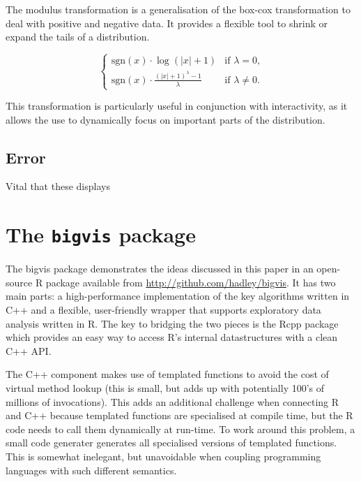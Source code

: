 \documentclass[journal]{vgtc}                %
\begin{document}
The modulus transformation \citep{john:1980} is a generalisation of the box-cox transformation \citep{box:1964} to deal with positive and negative data. It provides a flexible tool to shrink or expand the tails of a distribution.

\begin{equation}
\begin{cases} 
  \text{sgn}(x) \cdot \log(|x| + 1) & \text{if $\lambda = 0$,} \\
  \text{sgn}(x) \cdot \frac{(|x| + 1)^\lambda - 1}{\lambda} &\text{if $\lambda \ne 0$.}
\end{cases}
\end{equation}

This transformation is particularly useful in conjunction with interactivity, as it allows the use to dynamically focus on important parts of the distribution.

\subsection{Error}

Vital that these displays

\section{The {\tt bigvis} package}
\label{sec:bigvis}

The bigvis package demonstrates the ideas discussed in this paper in an open-source R package available from \url{http://github.com/hadley/bigvis}. It has two main parts: a high-performance implementation of the key algorithms written in C++ and a flexible, user-friendly wrapper that supports exploratory data analysis written in R. The key to bridging the two pieces is the Rcpp package \citep{eddelbuettel:2011} which provides an easy way to access R's internal datastructures with a clean C++ API. 

The C++ component makes use of templated functions to avoid the cost of virtual method lookup (this is small, but adds up with potentially 100's of millions of invocations). This adds an additional challenge when connecting R and C++ because templated functions are specialised at compile time, but the R code needs to call them dynamically at run-time. To work around this problem, a small code generater generates all specialised versions of templated functions. This is somewhat inelegant, but unavoidable when coupling programming languages with such different semantics.
\end{document}
